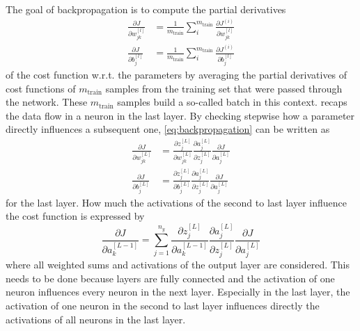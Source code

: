 The goal of backpropagation is to compute the partial derivatives
\begin{subequations}
	\label{eq:backpropagation}
	\begin{align}
		\frac{\partial J}{\partial w^{[l]}_{jk}} &= \frac{1}{m_{\text{train}}} \sum_{i}^{m_{\text{train}}} \frac{\partial J^{(i)}}{\partial w^{[l]}_{jk}} \\
		\frac{\partial J}{\partial b^{[l]}_j} &= \frac{1}{m_{\text{train}}} \sum_{i}^{m_{\text{train}}} \frac{\partial J^{(i)}}{\partial b^{[l]}_j}
	\end{align}
\end{subequations}
of the cost function w.r.t. the parameters by averaging the partial derivatives of cost functions of $m_{\text{train}}$ samples from the training set that were passed through the network.
These $m_{\text{train}}$ samples build a so-called batch in this context.
 recaps the data flow in a neuron in the last layer.
By checking stepwise how a parameter directly influences a subsequent one, \eqref{eq:backpropagation} can be written as
\begin{subequations}
	\label{eq:backpropagation-last}
	\begin{align}
		\frac{\partial J}{\partial w^{[L]}_{jk}} &= \frac{\partial z^{[L]}_j}{\partial w^{[L]}_{jk}} \frac{\partial a^{[L]}_{j}}{\partial z^{[L]}_{j}} \frac{\partial J}{\partial a^{[L]}_{j}} \\
		\frac{\partial J}{\partial b^{[L]}_{j}} &= \frac{\partial z^{[L]}_j}{\partial b^{[L]}_{j}} \frac{\partial a^{[L]}_{j}}{\partial z^{[L]}_{j}} \frac{\partial J}{\partial a^{[L]}_{j}}
	\end{align}
\end{subequations}
for the last layer.
How much the activations of the second to last layer influence the cost function is expressed by
\begin{equation}
	\label{eq:backpropagation-activations-last}
	\frac{\partial J}{\partial a^{[L-1]}_{k}} = \sum_{j=1}^{n_y} \frac{\partial z^{[L]}_j}{\partial a^{[L-1]}_{k}} \frac{\partial a^{[L]}_{j}}{\partial z^{[L]}_{j}} \frac{\partial J}{\partial a^{[L]}_{j}}
\end{equation}
where all weighted sums and activations of the output layer are considered.
This needs to be done because layers are fully connected and the activation of one neuron influences every neuron in the next layer.
Especially in the last layer, the activation of one neuron in the second to last layer influences directly the activations of all neurons in the last layer.

